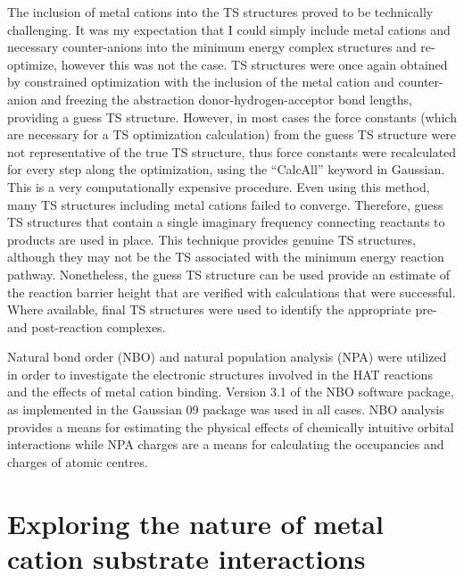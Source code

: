 \begin{doublespace}
The inclusion of metal cations into the TS structures proved to be technically
challenging. It was my expectation that I could simply include metal cations and
necessary counter-anions into the minimum energy complex structures and
re-optimize, however this was not the case. TS structures were once again
obtained by constrained optimization with the inclusion of the metal cation and
counter-anion and freezing the abstraction donor-hydrogen-acceptor bond lengths,
providing a guess TS structure. However, in most cases the force constants
(which are necessary for a TS optimization calculation) from the guess TS
structure were not representative of the true TS structure, thus force constants
were recalculated for every step along the optimization, using the ``CalcAll''
keyword in Gaussian. This is a very computationally expensive procedure. Even
using this method, many TS structures including metal cations failed to
converge. Therefore, guess TS structures that contain a single imaginary
frequency connecting reactants to products are used in place. This technique
provides genuine TS structures, although they may not be the TS associated with
the minimum energy reaction pathway. Nonetheless, the guess TS structure can be
used provide an estimate of the reaction barrier height that are verified with
calculations that were successful. Where available, final TS structures were
used to identify the appropriate pre- and post-reaction complexes.

Natural bond order (NBO) and natural population analysis (NPA) were utilized in
order to investigate the electronic structures involved in the HAT reactions and
the effects of metal cation binding.\cite{Reed1983, Reed1985, Glendening2012}
Version 3.1 of the NBO software package,\cite{NBO3} as implemented in the
Gaussian 09 package was used in all cases.\cite{Frisch2009} NBO analysis
provides a means for estimating the physical effects of chemically intuitive
orbital interactions while NPA charges are a means for calculating the
occupancies and charges of atomic centres.\cite{Landis2014, Weinhold2016}

\section{Exploring the nature of metal cation substrate interactions}


\end{doublespace}
